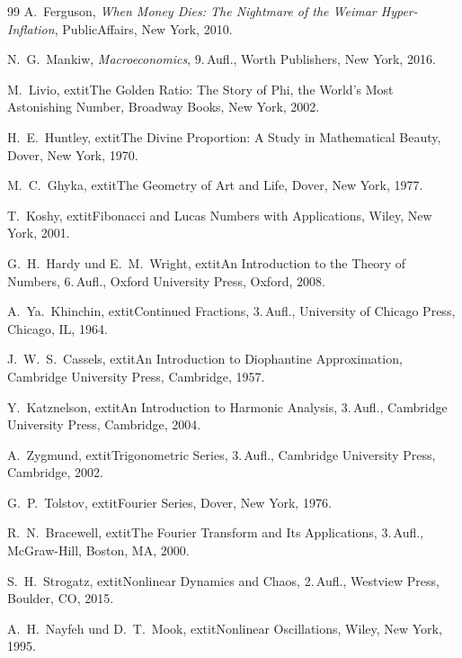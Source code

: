 \documentclass[a4paper,12pt,twoside]{report}
\theoremstyle{definition}
\begin{document}
\begin{thebibliography}{99}
	A.~Ferguson,
	\textit{When Money Dies: The Nightmare of the Weimar Hyper-Inflation},
	PublicAffairs, New York, 2010.

	N.~G.~Mankiw,
	\textit{Macroeconomics},
	9.\,Aufl., Worth Publishers, New York, 2016.

M.~Livio,
	extit{The Golden Ratio: The Story of Phi, the World's Most Astonishing Number},
Broadway Books, New York, 2002.

H.~E.~Huntley,
	extit{The Divine Proportion: A Study in Mathematical Beauty},
Dover, New York, 1970.

M.~C.~Ghyka,
	extit{The Geometry of Art and Life},
Dover, New York, 1977.

T.~Koshy,
	extit{Fibonacci and Lucas Numbers with Applications},
Wiley, New York, 2001.

G.~H.~Hardy und E.~M.~Wright,
	extit{An Introduction to the Theory of Numbers},
6.\,Aufl., Oxford University Press, Oxford, 2008.

A.~Ya.~Khinchin,
	extit{Continued Fractions},
3.\,Aufl., University of Chicago Press, Chicago, IL, 1964.

J.~W.~S.~Cassels,
	extit{An Introduction to Diophantine Approximation},
Cambridge University Press, Cambridge, 1957.

Y.~Katznelson,
	extit{An Introduction to Harmonic Analysis},
3.\,Aufl., Cambridge University Press, Cambridge, 2004.

A.~Zygmund,
	extit{Trigonometric Series},
3.\,Aufl., Cambridge University Press, Cambridge, 2002.

G.~P.~Tolstov,
	extit{Fourier Series},
Dover, New York, 1976.

R.~N.~Bracewell,
	extit{The Fourier Transform and Its Applications},
3.\,Aufl., McGraw-Hill, Boston, MA, 2000.

S.~H.~Strogatz,
	extit{Nonlinear Dynamics and Chaos},
2.\,Aufl., Westview Press, Boulder, CO, 2015.

A.~H.~Nayfeh und D.~T.~Mook,
	extit{Nonlinear Oscillations},
Wiley, New York, 1995.


\end{thebibliography}
\end{document}
